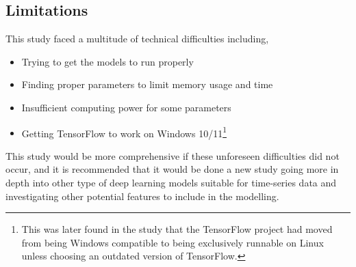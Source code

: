 \subsection{Limitations}\label{sec:limits}

This study faced a multitude of technical difficulties including,
\begin{itemize}
	\item Trying to get the models to run properly
	\item Finding proper parameters to limit memory usage and time
	\item Insufficient computing power for some parameters
	\item Getting TensorFlow to work on Windows 10/11\footnote{This was later found in the study that the TensorFlow project had moved from being Windows compatible to being exclusively runnable on Linux unless choosing an outdated version of TensorFlow.}
\end{itemize}
This study would be more comprehensive if these unforeseen difficulties did not occur, and it is recommended that it would be done a new study going more in depth into other type of deep learning models suitable for time-series data and investigating other potential features to include in the modelling. 

\label{pg:LastBread}